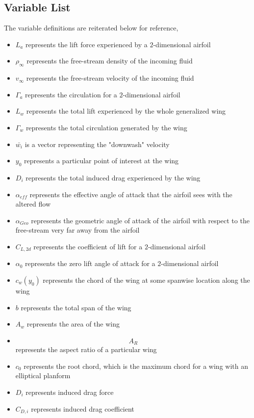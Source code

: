 \documentclass[a4paper, 12pt]{report}
\begin{document}
\begin{center}
\subsection{Variable List}
\begin{comment}
\end{comment}
The variable definitions are reiterated below for reference,
\begin{itemize}
\item $L_{a}$ represents the lift force experienced by a $2$-dimensional airfoil
\item $\rho_{\infty}$ represents the free-stream density of the incoming fluid
\item $v_{\infty}$ represents the free-stream velocity of the incoming fluid
\item $\Gamma_{a}$ represents the circulation for a $2$-dimensional airfoil
\item $L_{w}$ represents the total lift experienced by the whole generalized wing
\item $\Gamma_{w}$ represents the total circulation generated by the wing
\item $\bar{w_{i}}$ is a vector representing the "downwash" velocity
\item $y_{0}$ represents a particular point of interest at the wing
\item $D_{i}$ represents the total induced drag experienced by the wing
\item $\alpha_{eff}$ represents the effective angle of attack that the airfoil sees with the altered flow
\item $\alpha_{Geo}$ represents the geometric angle of attack of the airfoil with respect to the free-stream very far away from the airfoil
\item $C_{L,2d}$ represents the coefficient of lift for a $2$-dimensional airfoil
\item $\alpha_{0}$ represents the zero lift angle of attack for a $2$-dimensional airfoil
\item $c_{w}(y_{0})$ represents the chord of the wing at some spanwise location along the wing
\item $b$ represents the total span of the wing
\item $A_{w}$ represents the area of the wing
\item $$A_{R}$$ represents the aspect ratio of a particular wing
\item $c_{0}$ represents the root chord, which is the maximum chord for a wing with an elliptical planform
\item $D_{i}$ represents induced drag force
\item $C_{D,i}$ represents induced drag coefficient
\end{itemize}



\end{center}
\end{document}
